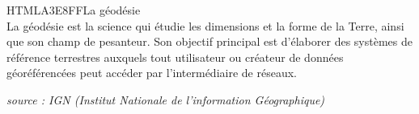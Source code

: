 \begin{colbox}{{HTML}{A3E8FF}}{La géodésie\\}
  La géodésie est la science qui étudie les dimensions et la forme de la Terre, ainsi que son champ de pesanteur. Son objectif principal est d’élaborer des systèmes de référence terrestres auxquels tout utilisateur ou créateur de données géoréférencées peut accéder par l’intermédiaire de réseaux.
  \begin{flushright}
  \textit{source : \textsc{IGN} (Institut Nationale de l'information Géographique)}
  \end{flushright}
\end{colbox}

